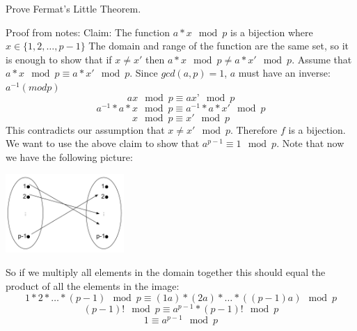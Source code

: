 \question Prove Fermat's Little Theorem. 
\begin{solution}
Proof from notes: \newline
Claim: The function $a*x \mod p$ is a bijection where $x \in \{1, 2, \dotsc, p-1\}$ \newline
The domain and range of the function are the same set, so it is enough to show that if $x \neq x'$ then $a*x \mod p  \neq  a*x' \mod p$. \newline
Assume that $a*x \mod p  \equiv  a*x' \mod p$.\newline
Since $gcd(a, p) = 1$, $a$ must have an inverse: $a^{-1} (mod p)$
\[ax \mod p \equiv ax’ \mod p\]
\[ a^{-1}*a*x \mod p \equiv  a^{-1}*a*x' \mod p\]
\[x \mod p \equiv x' \mod p \]
This contradicts our assumption that $x \neq x' \mod p$. Therefore $f$ is a bijection.
We want to use the above claim to show that $a^{p-1} \equiv 1 \mod p$. Note that now we have the following picture: \newline
\begin{center}
\includegraphics[width=4.5cm, height=30mm]{proof}
\end{center}
So if we multiply all elements in the domain together this should equal the product of all the elements in the image: \newline
\[ 1 * 2 * \dotsc * (p-1) \mod p \equiv (1a) * (2a) * \dotsc * ((p-1)a) \mod p\]
\[(p-1)! \mod p \equiv a^{p-1} * (p-1)! \mod p\]
\[1 \equiv a^{p-1} \mod p \]
\end{solution}

\clearpage